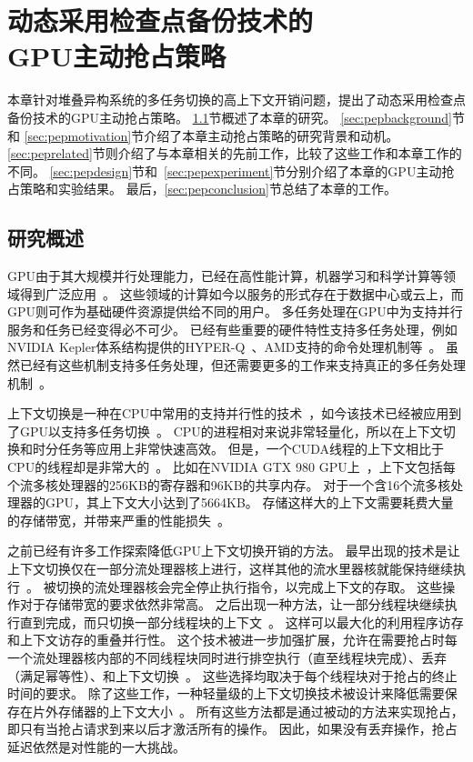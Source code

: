 \chapter{动态采用检查点备份技术的\\GPU主动抢占策略}
\label{chap:PEP}

本章针对堆叠异构系统的多任务切换的高上下文开销问题，提出了动态采用检查点备份技术的GPU主动抢占策略。
\ref{sec:pepintroduction}节概述了本章的研究。
\ref{sec:pepbackground}节和 \ref{sec:pepmotivation}节介绍了本章主动抢占策略的研究背景和动机。
\ref{sec:peprelated}节则介绍了与本章相关的先前工作，比较了这些工作和本章工作的不同。
\ref{sec:pepdesign}节和~\ref{sec:pepexperiment}节分别介绍了本章的GPU主动抢占策略和实验结果。
最后，\ref{sec:pepconclusion}节总结了本章的工作。




\section{研究概述}
\label{sec:pepintroduction}

GPU由于其大规模并行处理能力，已经在高性能计算，机器学习和科学计算等领域得到广泛应用~。
这些领域的计算如今以服务的形式存在于数据中心或云上，而GPU则可作为基础硬件资源提供给不同的用户。
多任务处理在GPU中为支持并行服务和任务已经变得必不可少。
已经有些重要的硬件特性支持多任务处理，例如NVIDIA Kepler体系结构提供的HYPER-Q~、AMD支持的命令处理机制等~。
虽然已经有这些机制支持多任务处理，但还需要更多的工作来支持真正的多任务处理机制~。

上下文切换是一种在CPU中常用的支持并行性的技术~，如今该技术已经被应用到了GPU以支持多任务切换~。
CPU的进程相对来说非常轻量化，所以在上下文切换和时分任务等应用上非常快速高效。
但是，一个CUDA线程的上下文相比于CPU的线程却是非常大的~。
比如在NVIDIA GTX 980 GPU上~，上下文包括每个流多核处理器的256KB的寄存器和96KB的共享内存。
对于一个含16个流多核处理器的GPU，其上下文大小达到了5664KB。
存储这样大的上下文需要耗费大量的存储带宽，并带来严重的性能损失~。

之前已经有许多工作探索降低GPU上下文切换开销的方法。
最早出现的技术是让上下文切换仅在一部分流处理器核上进行，这样其他的流水里器核就能保持继续执行~。
被切换的流处理器核会完全停止执行指令，以完成上下文的存取。
这些操作对于存储带宽的要求依然非常高。
之后出现一种方法，让一部分线程块继续执行直到完成，而只切换一部分线程块的上下文~。
这样可以最大化的利用程序访存和上下文访存的重叠并行性。
这个技术被进一步加强扩展，允许在需要抢占时每一个流处理器核内部的不同线程块同时进行排空执行（直至线程块完成）、丢弃（满足幂等性）、和上下文切换~。
这些选择均取决于每个线程块对于抢占的终止时间的要求。
除了这些工作，一种轻量级的上下文切换技术被设计来降低需要保存在片外存储器的上下文大小~。
所有这些方法都是通过被动的方法来实现抢占，即只有当抢占请求到来以后才激活所有的操作。
因此，如果没有丢弃操作，抢占延迟依然是对性能的一大挑战。

